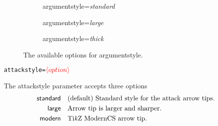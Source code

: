 \documentclass{article}
\newcommand{\tikzname}{Ti\emph{k}Z\xspace}
\newcommand{\opt}[2][red]{\ensuremath{\textcolor{#1}{\langle #2\rangle}}}
\begin{document}
\begin{figure}[!h]
    \begin{subfigure}{0.32\textwidth}
        \centering
        \begin{af}[argumentstyle=standard]
    
            \label{af:test}
        \end{af}
        \caption{\textsf{argumentstyle}=\textit{standard}}
        \label{fig:argumentstyle_standard}
    \end{subfigure}
    \hfill
    \begin{subfigure}{0.3\textwidth}
        \centering
        \begin{af}[argumentstyle=large]
    
        \end{af}
        \caption{\textsf{argumentstyle}=\textit{large}}
        \label{fig:argumentstyle_large}
    \end{subfigure}
    \hfill
    \begin{subfigure}{0.3\textwidth}
        \centering
        \begin{af}[argumentstyle=thick]
    
        \end{af}
        \caption{\textsf{argumentstyle}=\textit{thick}}
        \label{fig:argumentstyle_thick}
    \end{subfigure}
    \caption{The available options for \textsf{argumentstyle}.}
    \label{fig:argumentstyle}
\end{figure}

\newpage
\noindent\texttt{attackstyle=}\opt{option}
    
    The \textsf{attackstyle} parameter accepts three options
    \begin{align*}
        \mathsf{standard} &\quad \text{(default) Standard style for the attack arrow tips.}\\
        \mathsf{large} &\quad \text{Arrow tip is larger and sharper.}\\
        \mathsf{modern} &\quad \text{\tikzname ModernCS arrow tip.}\\
    \end{align*}
\end{document}

